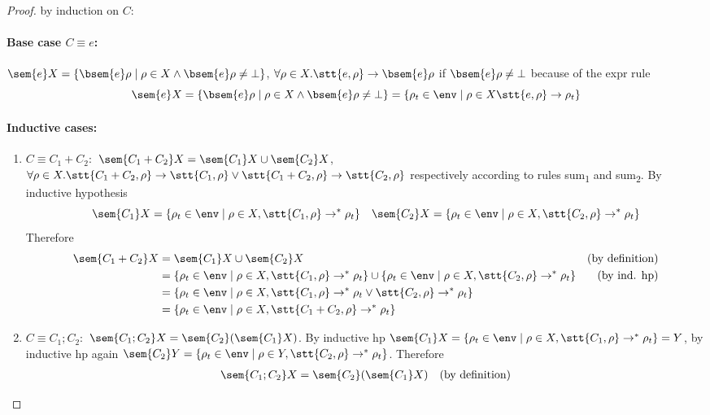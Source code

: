 \begin{proof}
  by induction on \(C\):
  \paragraph*{Base case \(C \equiv e\):\\}
  \(\sem{e}X = \{\bsem{e}\rho \mid \rho \in X \wedge \bsem{e}\rho \neq
  \bot \}\), \(\forall \rho \in X . \stt{e, \rho} \to \bsem{e}\rho\)
  if \(\bsem{e}\rho \neq \bot\) because of the expr rule \[\sem{e}X =
  \{\bsem{e}\rho \mid \rho \in X \wedge \bsem{e}\rho \neq \bot \} =
  \{\rho_t \in\env \mid \rho \in X \stt{e, \rho} \to \rho_t\}\]
  \paragraph*{Inductive cases:\\}
  \begin{enumerate}
  \item \(C \equiv C_1 + C_2:\) \(\sem{C_1 + C_2}X = \sem{C_1}X \cup
    \sem{C_2}X\), \(\forall \rho \in X . \stt{C_1 + C_2, \rho} \to
    \stt{C_1, \rho} \vee \stt{C_1 + C_2, \rho} \to \stt{C_2, \rho}\)
    respectively according to rules sum\textsubscript{1} and
    sum\textsubscript{2}. By inductive hypothesis \[\sem{C_1}X =
    \{\rho_t \in\env \mid \rho \in X , \stt{C_1,\rho} \to^* \rho_t\} \quad
    \sem{C_2}X = \{\rho_t \in\env \mid \rho \in X , \stt{C_2,\rho} \to^*
    \rho_t\}\] Therefore
    \begin{align*}
      \sem{C_1 + C_2}X & = \sem{C_1}X \cup \sem{C_2}X & \text{(by definition)}\\
      & = \{\rho_t \in\env \mid \rho \in X , \stt{C_1,\rho} \to^* \rho_t\} \cup \{\rho_t \in\env \mid \rho \in X , \stt{C_2,\rho} \to^* \rho_t\} & \text{(by ind. hp)}\\
      & = \{\rho_t \in\env \mid \rho \in X, \stt{C_1,\rho} \to^* \rho_t \vee \stt{C_2,\rho} \to^* \rho_t\} \\
      & = \{\rho_t \in\env \mid \rho \in X, \stt{C_1 + C_2, \rho} \to^* \rho_t\}
    \end{align*}
  \item \(C \equiv C_1;C_2:\) \(\sem{C_1;C_2}X =
    \sem{C_2}(\sem{C_1}X)\). By inductive hp \(\sem{C_1}X = \{\rho_t
    \in\env \mid \rho \in X, \stt{C_1, \rho} \to^* \rho_t\} = Y\), by inductive
    hp again \(\sem{C_2}Y = \{\rho_t \in\env \mid \rho \in Y, \stt{C_2, \rho}
    \to^* \rho_t\}\). Therefore
    \begin{align*}
      \sem{C_1;C_2}X & = \sem{C_2}(\sem{C_1}X) & \text{(by definition)}\\

\end{align*}
\end{enumerate}
\end{proof}
